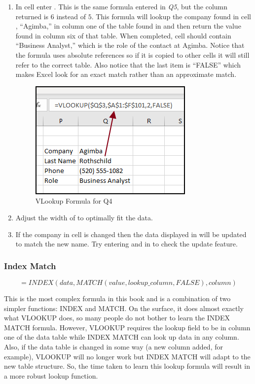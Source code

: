 \begin{enumerate}
	\item In cell  enter . This is the same formula entered in \textit{Q5}, but the column returned is $ 6 $ instead of $ 5 $. This formula will lookup the company found in cell , ``Agimba,'' in column one of the table found in  and then return the value found in column six of that table. When completed, cell  should contain ``Business Analyst,'' which is the role of the contact at Agimba.  Notice that the formula uses absolute references so if it is copied to other cells it will still refer to the correct table. Also notice that the last item is ``FALSE'' which makes Excel look for an exact match rather than an approximate match.
	
	\begin{figure}[H]
		\centering
		\includegraphics[width=\maxwidth{.75\linewidth}]{gfx/ch09_fig36}
		\caption{VLookup Formula for Q4}
		\label{09:fig36}
	\end{figure}
	
	\item Adjust the width of  to optimally fit the data.
	\item If the company in cell  is changed then the data displayed in  will be updated to match the new name. Try entering  and  in  to check the update feature.
\end{enumerate}

\subsubsection{Index Match}

\[ =INDEX(data,MATCH(value,lookup\_column,FALSE),column) \]

This is the most complex formula in this book and is a combination of two simpler functions: INDEX and MATCH. On the surface, it does almost exactly what VLOOKUP does, so many people do not bother to learn the INDEX MATCH formula. However, VLOOKUP requires the lookup field to be in column one of the data table while INDEX MATCH can look up data in any column. Also, if the data table is changed in some way (a new column added, for example), VLOOKUP will no longer work but INDEX MATCH will adapt to the new table structure. So, the time taken to learn this lookup formula will result in a more robust lookup function.

